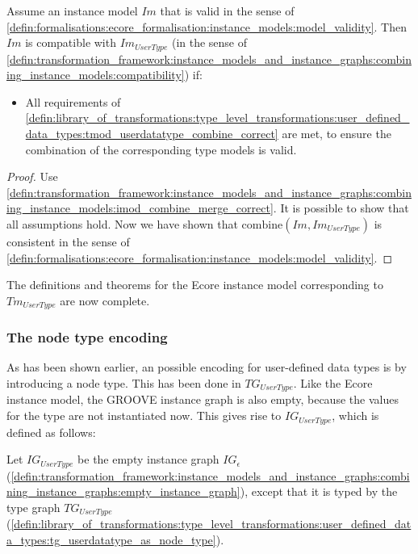 \begin{thm}
\label{defin:library_of_transformations:instance_level_transformations:user_defined_data_types:imod_userdatatype_combine_correct}
Assume an instance model $Im$ that is valid in the sense of \cref{defin:formalisations:ecore_formalisation:instance_models:model_validity}. Then $Im$ is compatible with $Im_{UserType}$ (in the sense of \cref{defin:transformation_framework:instance_models_and_instance_graphs:combining_instance_models:compatibility}) if:
\begin{itemize}
    \item All requirements of \cref{defin:library_of_transformations:type_level_transformations:user_defined_data_types:tmod_userdatatype_combine_correct} are met, to ensure the combination of the corresponding type models is valid.
\end{itemize}
\end{thm}

\begin{proof}
Use \cref{defin:transformation_framework:instance_models_and_instance_graphs:combining_instance_models:imod_combine_merge_correct}. It is possible to show that all assumptions hold. Now we have shown that $\mathrm{combine}(Im, Im_{UserType})$ is consistent in the sense of \cref{defin:formalisations:ecore_formalisation:instance_models:model_validity}.
\end{proof}

The definitions and theorems for the Ecore instance model corresponding to $Tm_{UserType}$ are now complete. 

\subsubsection{The node type encoding}

As has been shown earlier, an possible encoding for user-defined data types is by introducing a node type. This has been done in $TG_{UserType}$. Like the Ecore instance model, the GROOVE instance graph is also empty, because the values for the type are not instantiated now. This gives rise to $IG_{UserType}$, which is defined as follows:

\begin{defin}
\label{defin:library_of_transformations:instance_level_transformations:user_defined_data_types:ig_userdatatype_as_node_type}
Let $IG_{UserType}$ be the empty instance graph $IG_\epsilon$ (\cref{defin:transformation_framework:instance_models_and_instance_graphs:combining_instance_graphs:empty_instance_graph}), except that it is typed by the type graph $TG_{UserType}$ (\cref{defin:library_of_transformations:type_level_transformations:user_defined_data_types:tg_userdatatype_as_node_type}).
\end{defin}

